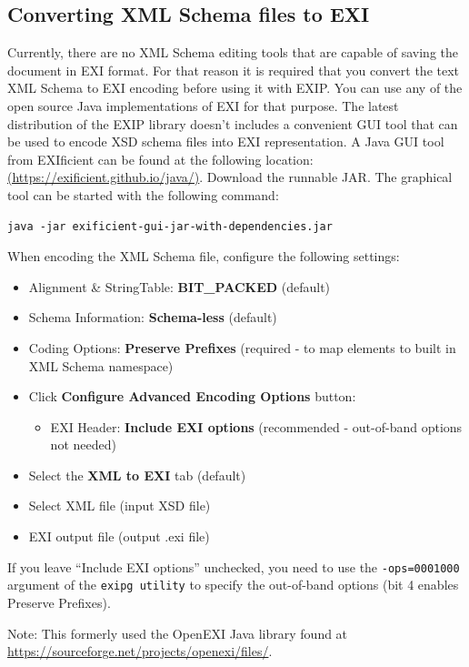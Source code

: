\subsection{Converting XML Schema files to EXI}
Currently, there are no XML Schema editing tools that are capable of saving the document in EXI format.
For that reason it is required that you convert the text XML Schema to EXI encoding before using it
with EXIP. You can use any of the open source Java implementations of EXI for that purpose.
The latest distribution of the EXIP library doesn't includes a convenient GUI tool
that can be used to encode XSD schema files into EXI representation. A Java GUI tool from EXIficient can be found
at the following location: \href{https://exificient.github.io/java/}{(https://exificient.github.io/java/)}.
Download the runnable JAR. The graphical tool can be started with the following command:
\begin{lstlisting}
java -jar exificient-gui-jar-with-dependencies.jar
\end{lstlisting}
When encoding the XML Schema file, configure the following settings:
\begin{itemize}
\item Alignment \& StringTable: \textbf{BIT\_PACKED} (default)
\item Schema Information: \textbf{Schema-less} (default)
\item Coding Options: \textbf{Preserve Prefixes} (required - to map elements to built in XML Schema namespace)
\item Click \textbf{Configure Advanced Encoding Options} button:
\begin{itemize}
\item EXI Header: \textbf{Include EXI options} (recommended - out-of-band options not needed)
\end{itemize}
\item Select the \textbf{XML to EXI} tab (default)
\item Select XML file (input XSD file)
\item EXI output file (output .exi file)
\end{itemize}

If you leave ``Include EXI options'' unchecked, you need to use the \texttt{-ops=0001000} argument
of the \texttt{exipg utility} to specify the out-of-band options (bit 4 enables Preserve Prefixes).

Note: This formerly used the OpenEXI Java library found at
\url{https://sourceforge.net/projects/openexi/files/}.
